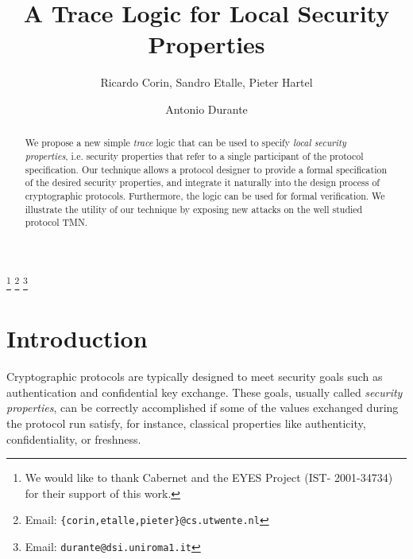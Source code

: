 \documentclass{entcs} \usepackage{entcsmacro}
\begin{document}
\begin{frontmatter}
\title{A Trace Logic for Local Security Properties}

\author{Ricardo Corin, Sandro Etalle, Pieter Hartel
}

\address{Faculty of Computer Science,\\
University of Twente, P.O.Box 217,  7500AE Enschede, The Netherlands}

\author{Antonio Durante
}
\address{Universit\`a di Roma ``La Sapienza'', Via Salaria 113, Rome 00198, 
Italy}
\thanks[ALL]{We would like to thank Cabernet and the EYES Project (IST- 2001-34734) for their support of this work.}  
\thanks[myemail]{Email: \texttt{\{corin,etalle,pieter\}@cs.utwente.nl}}
\thanks[email]{Email: \texttt{durante@dsi.uniroma1.it}}


\begin{abstract} We propose a new simple \emph{trace} logic
  that can be used to specify \emph{local security properties}, i.e.
  security properties that refer to a single participant of the
  protocol specification.  Our technique allows a protocol designer to
  provide a formal specification of the desired security properties, and
  integrate it naturally into the design process of cryptographic
  protocols.  Furthermore, the logic can be used for formal
  verification. We illustrate the utility of our technique by exposing
  new attacks on the well studied protocol TMN.
\end{abstract}
\end{frontmatter}
\section{Introduction}

Cryptographic protocols are typically designed to meet security goals
such as authentication and confidential key exchange. These goals,
usually called \emph{security properties}, can be correctly
accomplished if some of the values exchanged during the protocol run
satisfy, for instance, classical properties like authenticity,
confidentiality, or freshness.
\end{document}
